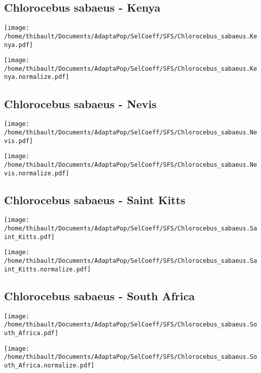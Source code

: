 \subsection{Chlorocebus sabaeus - Kenya} 
 
\begin{minipage}{0.49\linewidth} 
\texttt{[image: /home/thibault/Documents/AdaptaPop/SelCoeff/SFS/Chlorocebus\_sabaeus.Kenya.pdf]} 
\end{minipage}
\begin{minipage}{0.49\linewidth}
\texttt{[image: /home/thibault/Documents/AdaptaPop/SelCoeff/SFS/Chlorocebus\_sabaeus.Kenya.normalize.pdf]} 
\end{minipage}
\subsection{Chlorocebus sabaeus - Nevis} 
 
\begin{minipage}{0.49\linewidth} 
\texttt{[image: /home/thibault/Documents/AdaptaPop/SelCoeff/SFS/Chlorocebus\_sabaeus.Nevis.pdf]} 
\end{minipage}
\begin{minipage}{0.49\linewidth}
\texttt{[image: /home/thibault/Documents/AdaptaPop/SelCoeff/SFS/Chlorocebus\_sabaeus.Nevis.normalize.pdf]} 
\end{minipage}
\subsection{Chlorocebus sabaeus - Saint Kitts} 
 
\begin{minipage}{0.49\linewidth} 
\texttt{[image: /home/thibault/Documents/AdaptaPop/SelCoeff/SFS/Chlorocebus\_sabaeus.Saint\_Kitts.pdf]} 
\end{minipage}
\begin{minipage}{0.49\linewidth}
\texttt{[image: /home/thibault/Documents/AdaptaPop/SelCoeff/SFS/Chlorocebus\_sabaeus.Saint\_Kitts.normalize.pdf]} 
\end{minipage}
\subsection{Chlorocebus sabaeus - South Africa} 
 
\begin{minipage}{0.49\linewidth} 
\texttt{[image: /home/thibault/Documents/AdaptaPop/SelCoeff/SFS/Chlorocebus\_sabaeus.South\_Africa.pdf]} 
\end{minipage}
\begin{minipage}{0.49\linewidth}
\texttt{[image: /home/thibault/Documents/AdaptaPop/SelCoeff/SFS/Chlorocebus\_sabaeus.South\_Africa.normalize.pdf]} 
\end{minipage}
